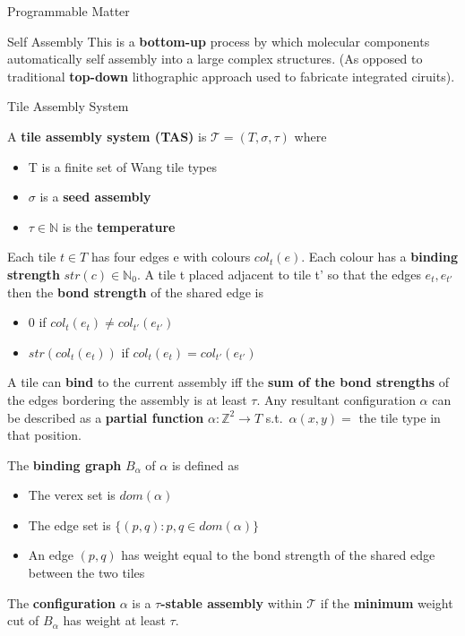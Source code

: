\documentclass[12pt, letterpaper]{article}
\begin{document}
\begin{section}{Programmable Matter}
\begin{subsection}{Self Assembly}
    This is a \textbf{bottom-up} process by which molecular components
    automatically self assembly into a large complex structures. (As opposed to
    traditional \textbf{top-down} lithographic approach used to fabricate
    integrated ciruits).

    \begin{subsubsection}{Tile Assembly System}

      A \textbf{tile assembly system (TAS)} is \(\mathcal{T} = (T, \sigma,
      \tau)\) where
      \begin{itemize}
        \item T is a finite set of Wang tile types
        \item \(\sigma\) is a \textbf{seed assembly}
        \item \(\tau \in \mathbb{N}\) is the \textbf{temperature}
      \end{itemize}

      Each tile \(t \in T\) has four edges e with colours \(col_{t}(e)\). Each
      colour has a \textbf{binding strength} \(str(c) \in \mathbb{N}_{0}\). A
      tile t placed adjacent to tile t' so that the edges \(e_{t}, e_{t'}\)
      then the \textbf{bond strength} of the shared edge is
      \begin{itemize}
        \item 0 if \(col_{t}(e_{t}) \neq col_{t'}(e_{t'})\)
        \item \(str(col_{t}(e_{t}))\) if \(col_{t}(e_{t}) = col_{t'}(e_{t'})\)
      \end{itemize}
      A tile can \textbf{bind} to the current assembly iff the \textbf{sum of
        the bond strengths} of the edges bordering the assembly is at least
      \(\tau\).
      Any resultant configuration \(\alpha\) can be described as a
      \textbf{partial function} \(\alpha: \mathbb{Z}^{2} \to T\) s.t.\
      \(\alpha(x, y) = \) the tile type in that position.

      The \textbf{binding graph} \(B_{\alpha}\) of \(\alpha\) is defined as
      \begin{itemize}
        \item The verex set is \(dom(\alpha)\)
        \item The edge set is \(\{ (p, q): p, q \in dom(\alpha) \}\)
        \item An edge \((p, q)\) has weight equal to the bond strength of the
              shared edge between the two tiles
      \end{itemize}
      The \textbf{configuration} \(\alpha\) is a \textbf{\(\tau\)-stable
        assembly} within \(\mathcal{T}\) if the \textbf{minimum} weight cut of
      \(B_{\alpha}\) has weight at least \(\tau\).


\end{subsubsection}
\end{subsection}
\end{section}
\end{document}
